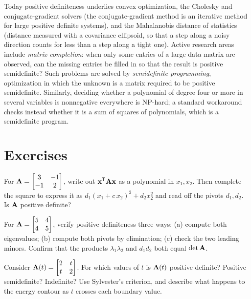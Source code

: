 \begin{historybox}
Today positive definiteness underlies convex optimization, the Cholesky and conjugate-gradient
solvers (the conjugate-gradient method is an iterative method for large positive definite systems),
and the Mahalanobis distance of statistics (distance measured with a covariance ellipsoid, so that a
step along a noisy direction counts for less than a step along a tight one). Active research areas
include \emph{matrix completion}: when only some entries of a large data matrix are observed, can
the missing entries be filled in so that the result is positive semidefinite? Such problems are
solved by \emph{semidefinite programming}, optimization in which the unknown is a matrix required to
be positive semidefinite. Similarly, deciding whether a polynomial of degree four or more in several
variables is nonnegative everywhere is NP-hard; a standard workaround checks instead whether it is a
sum of squares of polynomials, which is a semidefinite program.
\end{historybox}

\section{Exercises}

\begin{exercise}
\label{ch27:ex-warmup}
For $\mathbf{A} = \begin{bmatrix} 3 & -1 \\ -1 & 2 \end{bmatrix}$, write out $\mathbf{x}^{\mathsf{T}}\mathbf{A}\mathbf{x}$ as
a polynomial in $x_1, x_2$. Then complete the square to express it as $d_1(x_1 + c\,x_2)^2 + d_2
x_2^2$ and read off the pivots $d_1, d_2$. Is $\mathbf{A}$ positive definite?
\end{exercise}

\begin{exercise}
\label{ch27:ex-threetests}
For $\mathbf{A} = \begin{bmatrix} 5 & 4 \\ 4 & 5 \end{bmatrix}$, verify positive definiteness three
ways: (a) compute both eigenvalues; (b) compute both pivots by elimination; (c) check the two
leading minors. Confirm that the products $\lambda_1\lambda_2$ and $d_1 d_2$ both equal $\det\mathbf{A}$.
\end{exercise}

\begin{exercise}
\label{ch27:ex-boundary}
Consider $\mathbf{A}(t) = \begin{bmatrix} 2 & t \\ t & 2 \end{bmatrix}$. For which values of $t$ is
$\mathbf{A}(t)$ positive definite? Positive semidefinite? Indefinite? Use Sylvester's criterion, and
describe what happens to the energy contour as $t$ crosses each boundary value.
\end{exercise}

